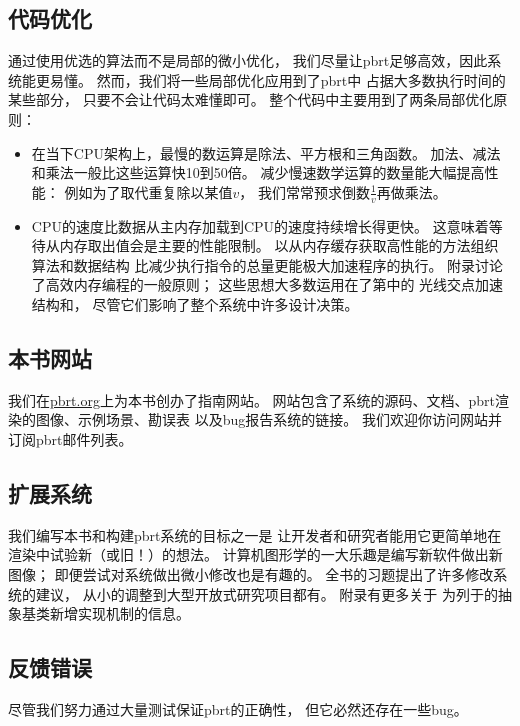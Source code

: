 \subsection{代码优化}\label{sub:代码优化}
通过使用优选的算法而不是局部的微小优化，
我们尽量让pbrt足够高效，因此系统能更易懂。
然而，我们将一些局部优化应用到了pbrt中
占据大多数执行时间的某些部分，
只要不会让代码太难懂即可。
整个代码中主要用到了两条局部优化原则：
\begin{itemize}
    \item 在当下CPU架构上，最慢的数运算是除法、平方根和三角函数。
          加法、减法和乘法一般比这些运算快10到50倍。
          减少慢速数学运算的数量能大幅提高性能：
          例如为了取代重复除以某值$v$，
          我们常常预求倒数$\displaystyle\frac{1}{v}$再做乘法。
    \item CPU的速度比数据从主内存加载到CPU的速度持续增长得更快。
          这意味着等待从内存取出值会是主要的性能限制。
          以从内存缓存获取高性能的方法组织算法和数据结构
          比减少执行指令的总量更能极大加速程序的执行。
          附录讨论了高效内存编程的一般原则；
          这些思想大多数运用在了第中的
          光线交点加速结构和，
          尽管它们影响了整个系统中许多设计决策。
\end{itemize}

\subsection{本书网站}\label{sub:本书网站}
我们在\href{https://pbrt.org/}{\ttfamily pbrt.org}上为本书创办了指南网站。
网站包含了系统的源码、文档、pbrt渲染的图像、示例场景、勘误表
以及bug报告系统的链接。
我们欢迎你访问网站并订阅pbrt邮件列表。

\subsection{扩展系统}\label{sub:扩展系统}
我们编写本书和构建pbrt系统的目标之一是
让开发者和研究者能用它更简单地在渲染中试验新（或旧！）的想法。
计算机图形学的一大乐趣是编写新软件做出新图像；
即便尝试对系统做出微小修改也是有趣的。
全书的习题提出了许多修改系统的建议，
从小的调整到大型开放式研究项目都有。
附录有更多关于
为列于的抽象基类新增实现机制的信息。

\subsection{反馈错误}\label{sub:反馈错误}
尽管我们努力通过大量测试保证pbrt的正确性，
但它必然还存在一些bug。

